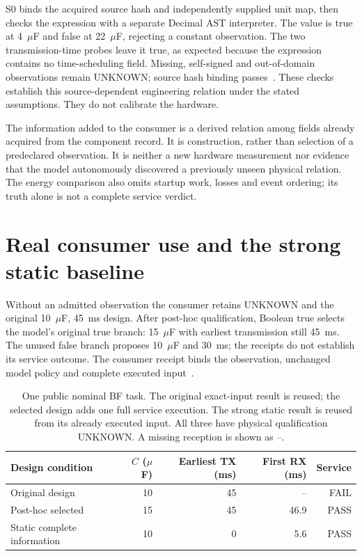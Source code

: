S0 binds the acquired source hash and independently supplied unit map, then
checks the expression with a separate Decimal AST interpreter. The value is
true at 4~$\mu$F and false at 22~$\mu$F, rejecting a constant observation.
The two transmission-time probes leave it true, as expected because the
expression contains no time-scheduling field. Missing, self-signed and
out-of-domain observations remain UNKNOWN; source hash binding
passes~\cite{qualification}. These checks establish this source-dependent
engineering relation under the stated assumptions. They do not calibrate
the hardware.

The information added to the consumer is a derived relation among fields
already acquired from the component record. It is construction, rather than
selection of a predeclared observation. It is neither a new hardware
measurement nor evidence that the model autonomously discovered a previously
unseen physical relation. The energy comparison also omits startup work,
losses and event ordering; its truth alone is not a complete service verdict.

\section{Real consumer use and the strong static baseline}
Without an admitted observation the consumer retains UNKNOWN and the original
10~$\mu$F, 45~ms design. After post-hoc qualification, Boolean true selects
the model's original true branch: 15~$\mu$F with earliest transmission still
45~ms. The unused false branch proposes 10~$\mu$F and 30~ms; the receipts do
not establish its service outcome. The consumer receipt binds the observation,
unchanged model policy and complete executed input~\cite{consumer}.

\begin{table}[ht]
\centering\small
\begin{tabular}{lrrrr}
\toprule
Design condition & $C$ ($\mu$F) & Earliest TX (ms) & First RX (ms) & Service \\
\midrule
Original design & 10 & 45 & -- & FAIL \\
Post-hoc selected & 15 & 45 & 46.9 & PASS \\
Static complete information & 10 & 0 & 5.6 & PASS \\
\bottomrule
\end{tabular}
\caption{One public nominal BF task. The original exact-input result is reused;
the selected design adds one full service execution. The strong static result
is reused from its already executed input. All three have physical
qualification UNKNOWN. A missing reception is shown as --.}
\label{tab:actual-service}
\end{table}

